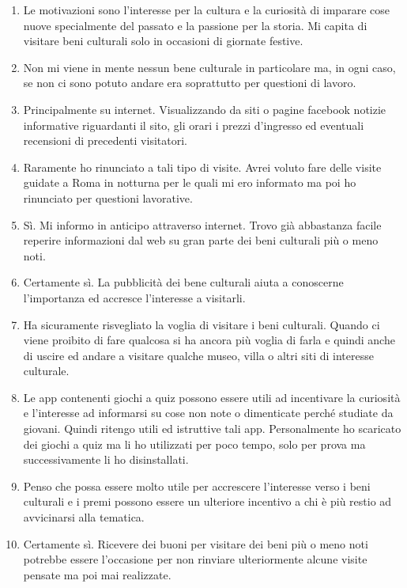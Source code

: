 \documentclass{article}
\begin{document}
\begin{enumerate}
\item Le motivazioni sono l'interesse per la cultura e la curiosità di imparare cose nuove specialmente del passato e la passione per la storia. Mi capita di visitare beni culturali solo in occasioni di giornate festive.
\item Non mi viene in mente nessun bene culturale in particolare ma, in ogni caso, se non ci sono potuto andare era soprattutto per questioni di lavoro.
\item Principalmente su internet. Visualizzando da siti o pagine facebook notizie informative riguardanti il sito, gli orari i prezzi d'ingresso ed eventuali recensioni di precedenti visitatori.
\item Raramente ho rinunciato a tali tipo di visite. Avrei voluto fare delle visite guidate a Roma in notturna per le quali mi ero informato ma poi ho rinunciato per questioni lavorative.
\item Sì. Mi informo in anticipo attraverso internet. Trovo già abbastanza facile reperire informazioni dal web su gran parte dei beni culturali più o meno noti.
\item Certamente sì. La pubblicità dei bene culturali aiuta a conoscerne l'importanza ed accresce l'interesse a visitarli.
\item Ha sicuramente risvegliato la voglia di visitare i beni culturali. Quando ci viene proibito di fare qualcosa si ha ancora più voglia di farla e quindi anche di uscire ed andare a visitare qualche museo, villa o altri siti di interesse culturale.
\item Le app contenenti giochi a quiz possono essere utili ad incentivare la curiosità e l'interesse ad informarsi su cose non note o dimenticate perché studiate da giovani. Quindi ritengo utili ed istruttive tali app. Personalmente ho scaricato dei giochi a quiz ma li ho utilizzati per poco tempo, solo per prova ma successivamente li ho disinstallati.
\item Penso che possa essere molto utile per accrescere l'interesse verso i beni culturali e i premi possono essere un ulteriore incentivo a chi è più restio ad avvicinarsi alla tematica.
\item Certamente sì. Ricevere dei buoni per visitare dei beni più o meno noti potrebbe essere l'occasione per non rinviare ulteriormente alcune visite pensate ma poi mai realizzate.
\end{enumerate}
\end{document}
